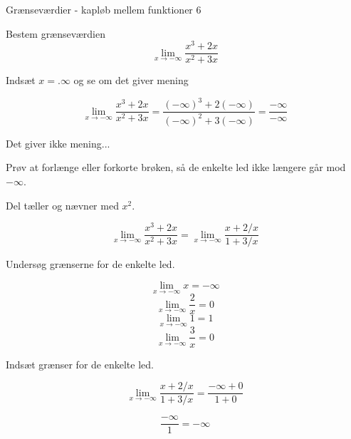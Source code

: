 \documentclass{article}
\begin{document}
\begin{exercise}{Grænseværdier - kapløb mellem funktioner 6}
	
	Bestem grænseværdien 
	\[
	\lim_{x \to -\infty} \frac{x^3 + 2x}{x^2 + 3x}
	\]
	
	
	\hint
	Indsæt $x=.\infty$ og se om det giver mening
	
	\hint
	\[
	\lim_{x \to -\infty} \frac{x^3 + 2x}{x^2 + 3x} = \frac{(-\infty)^3 + 2(-\infty)}{(-\infty)^2 + 3(-\infty)} = \frac{-\infty}{-\infty}
	\]
	
	\hint
	Det giver ikke mening...
	
	\hint
	Prøv at forlænge eller forkorte brøken, så de enkelte led ikke længere går mod $-\infty$. 
	
	\hint
	Del tæller og nævner med $x^2$. 
	
	\hint
	\[
	\lim_{x \to -\infty} \frac{x^3 + 2x}{x^2 + 3x} = \lim_{x \to -\infty} \frac{x + 2/x}{1 + 3/x}
	\]
	
	\hint
	Undersøg grænserne for de enkelte led.
	
	\hint
	\[
	\lim_{x \to -\infty} x = -\infty
	\]
	\[
	\lim_{x \to -\infty} \frac{2}{x} = 0
	\]
	\[
	\lim_{x \to -\infty} 1= 1
	\]
	\[
	\lim_{x \to -\infty} \frac{3}{x} = 0
	\]
	
	\hint 
	Indsæt grænser for de enkelte led.
	
	\hint
	\[
	\lim_{x \to -\infty} \frac{x + 2/x}{1 + 3/x} = \frac{-\infty + 0}{1 + 0 } 
	\]
	
	\hint
	\[
	\frac{-\infty}{1  }  = -\infty
	\]
	
\end{exercise}
\newpage
\end{document}
